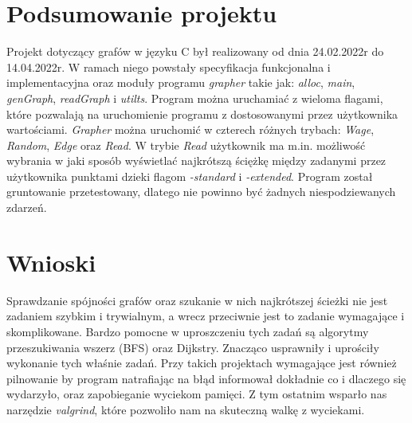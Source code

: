 \documentclass[10pt, a4paper]{report}
\begin{document}
    \section{Podsumowanie projektu}
    Projekt dotyczący grafów w języku C był realizowany od dnia 24.02.2022r do 14.04.2022r. W ramach niego powstały specyfikacja funkcjonalna i implementacyjna oraz moduły programu
    \textit{grapher} takie jak: \textit{alloc}, \textit{main}, \textit{genGraph}, \textit{readGraph} i \textit{utilts}. Program można uruchamiać z wieloma flagami, które pozwalają na uruchomienie programu
    z dostosowanymi przez użytkownika wartościami. \textit{Grapher} można uruchomić w czterech różnych trybach: \textit{Wage}, \textit{Random}, \textit{Edge} oraz \textit{Read}.
    W trybie \textit{Read} użytkownik ma m.in. możliwość wybrania w jaki sposób wyświetlać najkrótszą ściężkę między zadanymi przez użytkownika punktami dzieki flagom
    \textit{-standard} i \textit{-extended}. Program został gruntowanie przetestowany, dlatego nie powinno być żadnych niespodziewanych zdarzeń.

    \section{Wnioski}
    Sprawdzanie spójności grafów oraz szukanie w nich najkrótszej ścieżki nie jest zadaniem szybkim i trywialnym, a wrecz przeciwnie jest to zadanie wymagające i skomplikowane.
    Bardzo pomocne w uproszczeniu tych zadań są algorytmy przeszukiwania wszerz (BFS) oraz Dijkstry. Znacząco usprawniły i uprościły wykonanie tych właśnie zadań.
    Przy takich projektach wymagające jest również pilnowanie by program natrafiając na błąd informował dokładnie co i dlaczego się wydarzyło, oraz zapobieganie wyciekom pamięci.
    Z tym ostatnim wsparło nas narzędzie \textit{valgrind}, które pozwoliło nam na skuteczną walkę z wyciekami.
\end{document}
